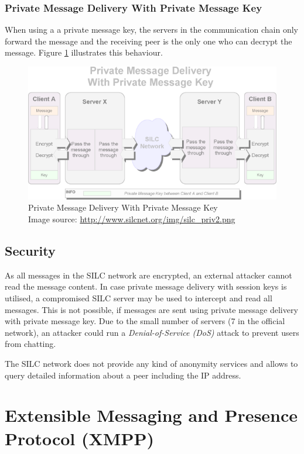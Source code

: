 \subsubsection{Private Message Delivery With Private Message Key}
When using a a private message key, the servers in the communication chain
only forward the message and the receiving peer is the only one who can
decrypt the message. Figure \ref{silcprivkey} illustrates this behaviour.
\begin{figure}
    \centering
    \caption[Silc: Private Message Delivery With Private Message Key]{Private Message Delivery With Private Message Key\\Image source: \protect\url{http://www.silcnet.org/img/silc_priv2.png}}
    \label{silcprivkey}
    \includegraphics[scale=0.8]{silc_priv2.png}
\end{figure}
\subsection{Security}
As all messages in the SILC network are encrypted, an external attacker
cannot read the message content. In case private message delivery with session keys
is utilised, a compromised SILC server may be used to intercept and read all
messages. This is not possible, if messages are sent using
private message delivery with private message key.
Due to the small number of servers (7 in the official network),
an attacker could run a \textit{Denial-of-Service (DoS)} attack to prevent
users from chatting.

The SILC network does not provide any kind of anonymity services and allows
to query detailed information about a peer including the IP address.
\section{Extensible Messaging and Presence Protocol (XMPP)}
